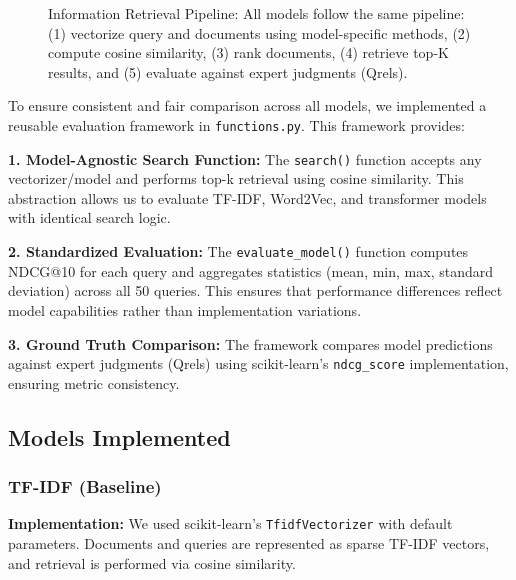 \documentclass[sigconf,nonacm]{acmart}
\begin{document}
\begin{figure}[h]
\caption{Information Retrieval Pipeline: All models follow the same pipeline: (1) vectorize query and documents using model-specific methods, (2) compute cosine similarity, (3) rank documents, (4) retrieve top-K results, and (5) evaluate against expert judgments (Qrels).}
\label{fig:ir_pipeline}
\end{figure}

To ensure consistent and fair comparison across all models, we implemented a reusable evaluation framework in \texttt{functions.py}. This framework provides:

\textbf{1. Model-Agnostic Search Function:} The \texttt{search()} function accepts any vectorizer/model and performs top-k retrieval using cosine similarity. This abstraction allows us to evaluate TF-IDF, Word2Vec, and transformer models with identical search logic.

\textbf{2. Standardized Evaluation:} The \texttt{evaluate\_model()} function computes NDCG@10 for each query and aggregates statistics (mean, min, max, standard deviation) across all 50 queries. This ensures that performance differences reflect model capabilities rather than implementation variations.

\textbf{3. Ground Truth Comparison:} The framework compares model predictions against expert judgments (Qrels) using scikit-learn's \texttt{ndcg\_score} implementation, ensuring metric consistency.

\subsection{Models Implemented}

\subsubsection{TF-IDF (Baseline)}
\textbf{Implementation:} We used scikit-learn's \texttt{TfidfVectorizer} with default parameters. Documents and queries are represented as sparse TF-IDF vectors, and retrieval is performed via cosine similarity.
\end{document}

